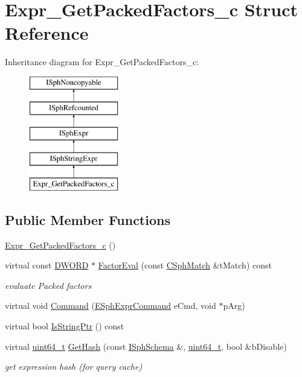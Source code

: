 \hypertarget{structExpr__GetPackedFactors__c}{\section{Expr\-\_\-\-Get\-Packed\-Factors\-\_\-c Struct Reference}
\label{structExpr__GetPackedFactors__c}
}
Inheritance diagram for Expr\-\_\-\-Get\-Packed\-Factors\-\_\-c\-:\begin{figure}[H]
\begin{center}
\leavevmode
\includegraphics[height=5.000000cm]{structExpr__GetPackedFactors__c}
\end{center}
\end{figure}
\subsection*{Public Member Functions}
\begin{DoxyCompactItemize}
\item 
\hyperlink{structExpr__GetPackedFactors__c_af78bba44ece527c653a63d51d5f7dec1}{Expr\-\_\-\-Get\-Packed\-Factors\-\_\-c} ()
\item 
virtual const \hyperlink{sphinxstd_8h_a798af1e30bc65f319c1a246cecf59e39}{D\-W\-O\-R\-D} $\ast$ \hyperlink{structExpr__GetPackedFactors__c_a301c811a3f65dd26c7653b7990bbf649}{Factor\-Eval} (const \hyperlink{classCSphMatch}{C\-Sph\-Match} \&t\-Match) const 
\begin{DoxyCompactList}\small\item\em evaluate Packed factors \end{DoxyCompactList}\item 
virtual void \hyperlink{structExpr__GetPackedFactors__c_a0bf77ea2827b66cd666c8ec88a2791b2}{Command} (\hyperlink{sphinxexpr_8h_a30be184fb07bd80c271360fc6094c818}{E\-Sph\-Expr\-Command} e\-Cmd, void $\ast$p\-Arg)
\item 
virtual bool \hyperlink{structExpr__GetPackedFactors__c_a2bd07b5e40152bc0ae4a388c6c1fa1fe}{Is\-String\-Ptr} () const 
\item 
virtual \hyperlink{sphinxstd_8h_aaa5d1cd013383c889537491c3cfd9aad}{uint64\-\_\-t} \hyperlink{structExpr__GetPackedFactors__c_a5d9270ae45b995bd096577dc36a1992b}{Get\-Hash} (const \hyperlink{classISphSchema}{I\-Sph\-Schema} \&, \hyperlink{sphinxstd_8h_aaa5d1cd013383c889537491c3cfd9aad}{uint64\-\_\-t}, bool \&b\-Disable)
\begin{DoxyCompactList}\small\item\em get expression hash (for query cache) \end{DoxyCompactList}\end{DoxyCompactItemize}
